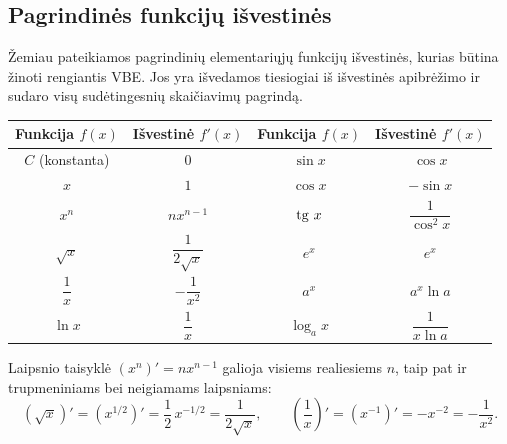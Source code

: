 \subsection{Pagrindinės funkcijų išvestinės}

Žemiau pateikiamos pagrindinių elementariųjų funkcijų išvestinės, kurias būtina
žinoti rengiantis VBE. Jos yra išvedamos tiesiogiai iš išvestinės apibrėžimo ir
sudaro visų sudėtingesnių skaičiavimų pagrindą.

\begin{tcolorbox}[title={Pagrindinių funkcijų išvestinių lentelė}, colback=blue!5, colframe=blue!40!black]
\begin{center}
\renewcommand{\arraystretch}{1.8}
\begin{tabular}{|c|c||c|c|}
\hline
\textbf{Funkcija} $f(x)$ & \textbf{Išvestinė} $f'(x)$ & \textbf{Funkcija} $f(x)$ & \textbf{Išvestinė} $f'(x)$ \\
\hline
$C$ (konstanta) & $0$ & $\sin x$ & $\cos x$ \\
\hline
$x$ & $1$ & $\cos x$ & $-\sin x$ \\
\hline
$x^n$ & $n x^{n-1}$ & $\operatorname{tg}\, x$ & $\dfrac{1}{\cos^2 x}$ \\
\hline
$\sqrt{x}$ & $\dfrac{1}{2\sqrt{x}}$ & $e^x$ & $e^x$ \\
\hline
$\dfrac{1}{x}$ & $-\dfrac{1}{x^2}$ & $a^x$ & $a^x \ln a$ \\
\hline
$\ln x$ & $\dfrac{1}{x}$ & $\log_a x$ & $\dfrac{1}{x \ln a}$ \\
\hline
\end{tabular}
\end{center}
\end{tcolorbox}

\begin{remark}
Laipsnio taisyklė $(x^n)' = nx^{n-1}$ galioja visiems realiesiems $n$, taip pat ir
trupmeniniams bei neigiamams laipsniams:
\[
\left(\sqrt{x}\right)' = \left(x^{1/2}\right)' = \frac{1}{2}\,x^{-1/2} = \frac{1}{2\sqrt{x}}, \qquad
\left(\frac{1}{x}\right)' = \left(x^{-1}\right)' = -x^{-2} = -\frac{1}{x^2}.
\]
\end{remark}

